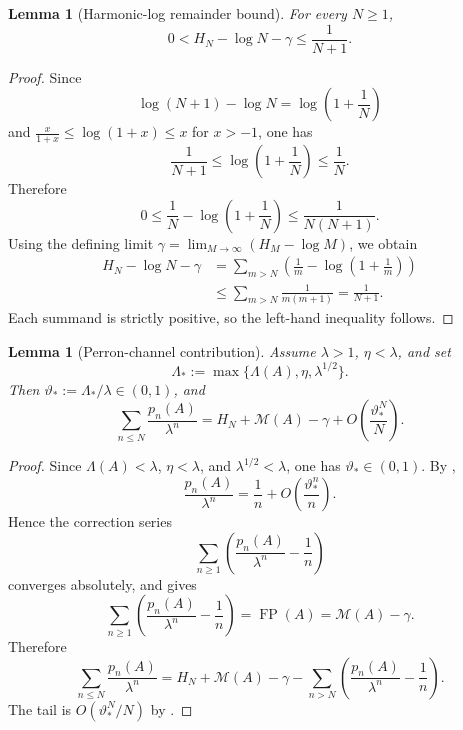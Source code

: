\documentclass[11pt,a4paper]{amsart}
\theoremstyle{plain}
\newtheorem{lemma}[theorem]{Lemma}
\theoremstyle{definition}
\theoremstyle{remark}
\DeclareMathOperator{\FP}{FP}
\begin{document}
\begin{lemma}[Harmonic-log remainder bound]
  \label{lem:harmonic-log-remainder}
  For every \(N\ge 1\),
  \[
    0
    <
    H_N-\log N-\gamma
    \le
    \frac{1}{N+1}.
  \]
\end{lemma}

\begin{proof}
  Since
  \[
    \log(N+1)-\log N
    =
    \log\!\left(1+\frac{1}{N}\right)
  \]
  and \(\frac{x}{1+x}\le \log(1+x)\le x\) for \(x>-1\), one has
  \[
    \frac{1}{N+1}
    \le
    \log\!\left(1+\frac{1}{N}\right)
    \le
    \frac{1}{N}.
  \]
  Therefore
  \[
    0
    \le
    \frac{1}{N}-\log\!\left(1+\frac{1}{N}\right)
    \le
    \frac{1}{N(N+1)}.
  \]
  Using the defining limit
  \(\gamma=\lim_{M\to\infty}(H_M-\log M)\), we obtain
  \begin{align*}
    H_N-\log N-\gamma
    &=
    \sum_{m>N}
      \left(
        \frac{1}{m}-\log\!\left(1+\frac{1}{m}\right)
      \right) \\
    &\le
    \sum_{m>N}\frac{1}{m(m+1)}
    =
    \frac{1}{N+1}.
  \end{align*}
  Each summand is strictly positive, so the left-hand inequality follows.
\end{proof}

\begin{lemma}[Perron-channel contribution]
  \label{lem:perron-channel-contribution}
  Assume \(\lambda>1\), \(\eta<\lambda\), and set
  \[
    \Lambda_*:=\max\{\Lambda(A),\eta,\lambda^{1/2}\}.
  \]
  Then \(\vartheta_*:=\Lambda_*/\lambda\in(0,1)\), and
  \[
    \sum_{n\le N}\frac{p_n(A)}{\lambda^n}
    =
    H_N+\mathcal M(A)-\gamma
    +O\!\left(\frac{\vartheta_*^N}{N}\right).
  \]
\end{lemma}

\begin{proof}
  Since \(\Lambda(A)<\lambda\), \(\eta<\lambda\), and
  \(\lambda^{1/2}<\lambda\), one has \(\vartheta_*\in(0,1)\). By
  ,
  \[
    \frac{p_n(A)}{\lambda^n}
    =
    \frac{1}{n}
    +O\!\left(\frac{\vartheta_*^n}{n}\right).
  \]
  Hence the correction series
  \[
    \sum_{n\ge 1}\left(\frac{p_n(A)}{\lambda^n}-\frac{1}{n}\right)
  \]
  converges absolutely, and  gives
  \[
    \sum_{n\ge 1}\left(\frac{p_n(A)}{\lambda^n}-\frac{1}{n}\right)
    =
    \FP(A)
    =
    \mathcal M(A)-\gamma.
  \]
  Therefore
  \[
    \sum_{n\le N}\frac{p_n(A)}{\lambda^n}
    =
    H_N+\mathcal M(A)-\gamma
    -\sum_{n>N}\left(\frac{p_n(A)}{\lambda^n}-\frac{1}{n}\right).
  \]
  The tail is \(O(\vartheta_*^N/N)\) by
  .
\end{proof}
\end{document}
